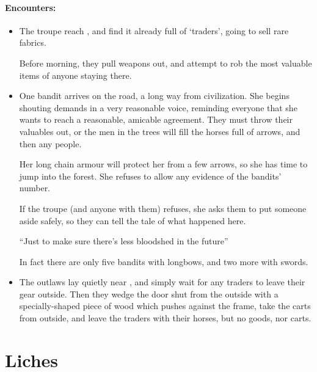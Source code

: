 \begin{multicols}{2}
\label{bandit}

\label{brigand}

\paragraph{Encounters:}


\begin{itemize}
  \item
  The troupe reach , and find it already full of `traders', going to sell rare fabrics.

  Before morning, they pull weapons out, and attempt to rob the most valuable items of anyone staying there.
  \item
  One bandit arrives on the road, a long way from civilization.
  She begins shouting demands in a very reasonable voice, reminding everyone that she wants to reach a reasonable, amicable agreement.
  They must throw their valuables out, or the men in the trees will fill the horses full of arrows, and then any people.

  Her long chain armour will protect her from a few arrows, so she has time to jump into the forest.
  She refuses to allow any evidence of the bandits' number.

  If the troupe (and anyone with them) refuses, she asks them to put someone aside safely, so they can tell the tale of what happened here.

  ``Just to make sure there's less bloodshed in the future''

  In fact there are only five bandits with longbows, and two more with swords.
  \item
  The outlaws lay quietly near , and simply wait for any traders to leave their gear outside.
  Then they wedge the door shut from the outside with a specially-shaped piece of wood which pushes against the frame, take the carts from outside, and leave the traders with their horses, but no goods, nor carts.
\end{itemize}

\end{multicols}

\section[Lich]{Liches}
\label{lich}

